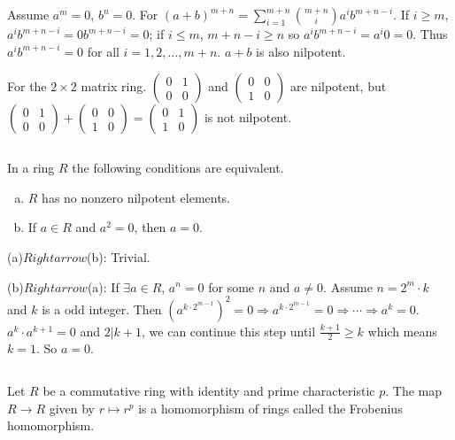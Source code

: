 \begin{answer}
    Assume $a^{m}=0$, $b^{n}=0$. For $(a+b)^{m+n}=\sum\limits_{i=1}^{m+n}\binom{m+n}{i}a^{i}b^{m+n-i}$. If $i\geq m$, $a^{i}b^{m+n-i}=0b^{m+n-i}=0$; if $i\leq m$, $m+n-i\geq n$ so $a^{i}b^{m+n-i}=a^{i}0=0$. Thus $a^{i}b^{m+n-i}=0$ for all $i=1,2,\dots, m+n$. $a+b$ is also nilpotent.

    For the $2\times 2$ matrix ring. $\begin{pmatrix}
        0&1\\0&0
    \end{pmatrix}$ and $\begin{pmatrix}
        0&0\\1&0
    \end{pmatrix}$ are nilpotent, but $\begin{pmatrix}
        0&1\\0&0
    \end{pmatrix}+\begin{pmatrix}
        0&0\\1&0
    \end{pmatrix}=\begin{pmatrix}
        0&1\\1&0
    \end{pmatrix}$ is not nilpotent.
\end{answer}

$$ $$

\begin{ex}
    In a ring $R$ the following conditions are equivalent.
    \begin{enumerate}[(a)]
        \item $R$ has no nonzero nilpotent elements.
        \item If $a\in R$ and $a^{2}=0$, then $a=0$.
    \end{enumerate}
\end{ex}

\begin{answer}
    (a)$Rightarrow$(b): Trivial.

    (b)$Rightarrow$(a): If $\exists a\in R$, $a^{n}=0$ for some $n$ and $a\neq 0$. Assume $n=2^{m}\cdot k$ and $k$ is a odd integer. Then $(a^{k\cdot 2^{m-1}})^{2}=0\Rightarrow a^{k\cdot 2^{m-1}}=0\Rightarrow \cdots\Rightarrow a^{k}=0$. $a^{k}\cdot a^{k+1}=0$ and $2|k+1$, we can continue this step until $\frac{k+1}{2}\geq k$ which means $k=1$. So $a=0$.
\end{answer}

$$ $$

\begin{ex}
    Let $R$ be a commutative ring with identity and prime characteristic $p$. The map $R\to R$ given by $r\mapsto r^{p}$ is a homomorphism of rings called the Frobenius homomorphism.
\end{ex}

